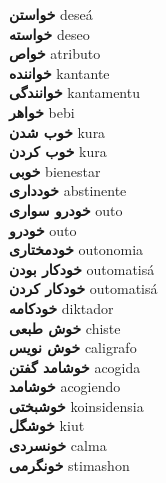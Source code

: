 \textbf{ خواستن  } deseá \\
\textbf{ خواسته  } deseo \\
\textbf{ خواص  } atributo \\
\textbf{ خواننده  } kantante \\
\textbf{ خوانندگی  } kantamentu \\
\textbf{ خواهر  } bebi \\
\textbf{ خوب شدن  } kura \\
\textbf{ خوب کردن  } kura \\
\textbf{ خوبی  } bienestar \\
\textbf{ خودداری  } abstinente \\
\textbf{ خودرو سواری  } outo \\
\textbf{ خودرو  } outo \\
\textbf{ خودمختاری  } outonomia \\
\textbf{ خودکار بودن  } outomatisá \\
\textbf{ خودکار کردن  } outomatisá \\
\textbf{ خودکامه  } diktador \\
\textbf{ خوش طبعی  } chiste \\
\textbf{ خوش نویس  } caligrafo \\
\textbf{ خوشامد گفتن  } acogida \\
\textbf{ خوشامد  } acogiendo \\
\textbf{ خوشبختی  } koinsidensia \\
\textbf{ خوشگل  } kiut \\
\textbf{ خونسردی  } calma \\
\textbf{ خونگرمی  } stimashon \\
